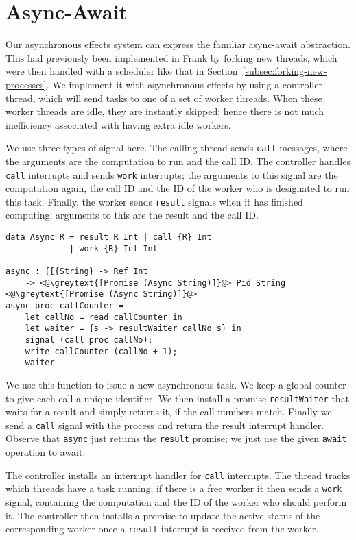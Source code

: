 \documentclass[msc,deptreport,cs]{infthesis} %
\newcommand{\code}[1]{\lstinline{#1}}
\newcommand{\greytext}[1]{\textcolor{black!40}{#1}}
\begin{document}
\section{Async-Await}
\label{sec:async-await}

Our asynchronous effects system can express the familiar async-await
abstraction. This had previously been implemented in Frank by \textsf{fork}ing
new threads, which were then handled with a scheduler like that in
Section~\ref{subsec:forking-new-processes}. We implement it with asynchronous
effects by using a controller thread, which will send tasks to one of a set of
worker threads. When these worker threads are idle, they are instantly skipped;
hence there is not much inefficiency associated with having extra idle workers.

We use three types of signal here. The calling thread sends \code{call}
messages, where the arguments are the computation to run and the call ID. The
controller handles \code{call} interrupts and sends \code{work} interrupts; the
arguments to this signal are the computation again, the call ID and the ID of
the worker who is designated to run this task. Finally, the worker sends
\code{result} signals when it has finished computing; arguments to this are the
result and the call ID.

\begin{lstlisting}
data Async R = result R Int | call {R} Int
             | work {R} Int Int

async : {[{String} -> Ref Int
    -> <@\greytext{[Promise (Async String)]}@> Pid String <@\greytext{[Promise (Async String)]}@>
async proc callCounter =
    let callNo = read callCounter in
    let waiter = {s -> resultWaiter callNo s} in
    signal (call proc callNo);
    write callCounter (callNo + 1);
    waiter
\end{lstlisting}

We use this function to issue a new asynchronous task. We keep a global counter
to give each call a unique identifier. We then install a promise
\code{resultWaiter} that waits for a result and simply returns it, if the call
numbers match. Finally we send a \code{call} signal with the process and return
the result interrupt handler. Observe that \code{async} just returns the
\code{result} promise; we just use the given \code{await} operation to await.


The controller installs an interrupt handler for \code{call} interrupts.
The thread tracks which threads have a task running; if there is a free worker
it then sends a \code{work} signal, containing the computation and the ID of the
worker who should perform it. The controller then installs a promise to update
the active status of the corresponding worker once a \code{result} interrupt is
received from the worker.
\end{document}
